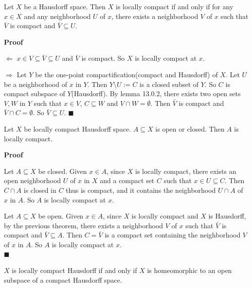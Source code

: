\documentclass[main.tex]{subfiles}
\begin{document}
\begin{theorem}
    Let $X$ be a Hausdorff space. Then $X$ is locally compact if and only if for any $x\in X$ and any neighborhood $U$ of $x$, there exists a neighborhood $V$ of $x$ such that $\bar{V}$ is compact and $\bar{V} \subseteq U$.
\end{theorem}

\par \noindent \textbf{Proof} 
\par $\Leftarrow$ $x\in V \subseteq \bar{V} \subseteq U$ and $\bar{V}$ is compact. So $X$ is locally compact at $x$.
\par $\Rightarrow$ Let $Y$ be the one-point compactification(compact and Hausdorff) of $X$. Let $U$ be a neighborhood of $x$ in $Y$. Then $Y\setminus U:= C$ is a closed subset of $Y$. So $C$ is compact subspace of $Y$(Hausdorff). By lemma 13.0.2, there exists two open sets $V, W$ in $Y$ such that $x \in V$, $C \subseteq W$ and $V \cap W = \emptyset$. Then $\bar{V}$ is compact and $\bar{V} \cap C = \emptyset$. So $\bar{V} \subseteq U$. \hfill $\blacksquare$

\begin{corollary}\label{coro:17.0.1}
    Let $X$ be locally compact Hausdorff space. $A \subseteq X$ is open or closed. Then $A$ is locally compact.
\end{corollary}

\par \noindent \textbf{Proof} 
\par Let $A \subseteq X$ be closed. Given $x\in A$, since $X$ is locally compact, there exists an open neighborhood $U$ of $x$ in $X$ and a compact set $C$ such that $x \in U \subseteq C$. Then $C \cap A$ is closed in $C$ thus is compact, and it contains the neighborhood $U \cap A$ of $x$ in $A$. So $A$ is locally compact at $x$. 

\par Let $A \subseteq X$ be open. Given $x\in A$, since $X$ is locally compact and $X$ is Hausdorff, by the previous theorem, there exists a neighborhood $V$ of $x$ such that $\bar{V}$ is compact and $\bar{V} \subseteq A$. Then $C = \bar{V}$ is a compact set containing the neighborhood $V$ of $x$ in $A$. So $A$ is locally compact at $x$. 
\mbox{} \\ \null \hfill $\blacksquare$ 

\begin{corollary}
    $X$ is locally compact Hausdorff if and only if $X$ is homeomorphic to an open subspace of a compact Hausdorff space. 
\end{corollary}
\end{document}
